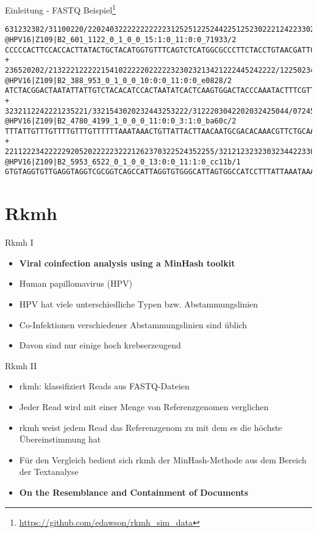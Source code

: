 \begin{frame}[fragile]{Einleitung - FASTQ Beispiel\footnote{\url{https://github.com/edawson/rkmh_sim_data}}}
    \begin{verbatim}
631232382/31100220/2202403222222222223125251225244225125230222124223302
@HPV16|Z109|B2_601_1122_0_1_0_0_15:1:0_11:0:0_71933/2
CCCCCACTTCCACCACTTATACTGCTACATGGTGTTTCAGTCTCATGGCGCCCTTCTACCTGTAACGATTC
+
236520202/2132221222221541022222022222323023213421222445242222/12250234
@HPV16|Z109|B2_388_953_0_1_0_0_10:0:0_11:0:0_e0828/2
ATCTACGGACTAATATTATTGTCTACACATCCACTAATATCACTCAAGTGGACTACCCAAATACTTTCGTT
+
3232112242221235221/3321543020232443253222/3122203042202032425044/07245
@HPV16|Z109|B2_4780_4199_1_0_0_0_11:0:0_3:1:0_ba60c/2
TTTATTGTTTGTTTTGTTTGTTTTTTAAATAAACTGTTATTACTTAACAATGCGACACAAACGTTCTGCAA
+
221122234222229205202222232221262370322524352255/3212123232303234422330
@HPV16|Z109|B2_5953_6522_0_1_0_0_13:0:0_11:1:0_cc11b/1
GTGTAGGTGTTGAGGTAGGTCGCGGTCAGCCATTAGGTGTGGGCATTAGTGGCCATCCTTTATTAAATAAA
    \end{verbatim}
\end{frame}

\section{Rkmh}

\begin{frame}{Rkmh I}
    \begin{itemize}
        \item \textbf{Viral coinfection analysis using a MinHash toolkit \cite{rkmh}}
        \item Human papillomavirus (HPV)
        \item HPV hat viele unterschiedliche Typen bzw. Abstammungslinien
        \item Co-Infektionen verschiedener Abstammungslinien sind üblich
        \item Davon sind nur einige hoch krebserzeugend
    \end{itemize}
\end{frame}

\begin{frame}{Rkmh II}
    \begin{itemize}
        \item rkmh: klassifiziert Reads aus FASTQ-Dateien
        \item Jeder Read wird mit einer Menge von Referenzgenomen verglichen
        \item rkmh weist jedem Read das Referenzgenom zu mit dem es die höchste Übereinstimmung hat
        \item Für den Vergleich bedient sich rkmh der MinHash-Methode  aus dem Bereich der Textanalyse
        \item \textbf{On the Resemblance and Containment of Documents \cite{minhash}}
    \end{itemize}
\end{frame}